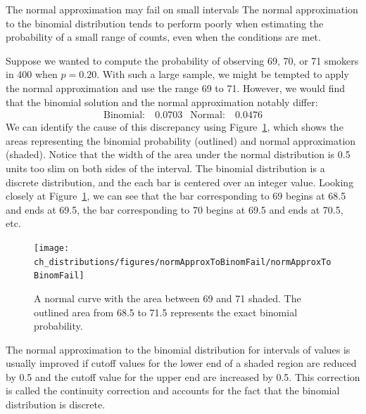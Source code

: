 \begin{caution}{The normal approximation may fail on small intervals}
{The normal approximation to the binomial distribution tends to perform poorly when estimating the probability of a small range of counts, even when the conditions are met.}
\end{caution}

Suppose we wanted to compute the probability of observing 69, 70, or 71 smokers in 400 when $p=0.20$. With such a large sample, we might be tempted to apply the normal approximation and use the range 69 to 71. However, we would find that the binomial solution and the normal approximation notably differ:
\begin{align*}
\text{Binomial:}&\ 0.0703
&\text{Normal:}&\ 0.0476
\end{align*}
We can identify the cause of this discrepancy using Figure~\ref{normApproxToBinomFail}, which shows the areas representing the binomial probability (outlined) and normal approximation (shaded). Notice that the width of the area under the normal distribution is 0.5 units too slim on both sides of the interval. The binomial distribution is a discrete distribution, and the each bar is centered over an integer value. Looking closely at Figure~\ref{normApproxToBinomFail}, we can see that the bar corresponding to 69 begins at 68.5 and ends at 69.5, the bar corresponding to 70 begins at 69.5 and ends at 70.5, etc.

\begin{figure}[h]
\centering
\texttt{[image: ch\_distributions/figures/normApproxToBinomFail/normApproxToBinomFail]}
\caption{A normal curve with the area between 69 and 71 shaded. The outlined area from 68.5 to 71.5 represents the exact binomial probability.}
\label{normApproxToBinomFail}
\end{figure}

\begin{tipBox}{
The normal approximation to the binomial distribution for intervals of values is usually improved if cutoff values for the lower end of a shaded region are reduced by 0.5 and the cutoff value for the upper end are increased by 0.5. This correction is called the continuity correction and accounts for the fact that the binomial distribution is discrete.}
\end{tipBox}

